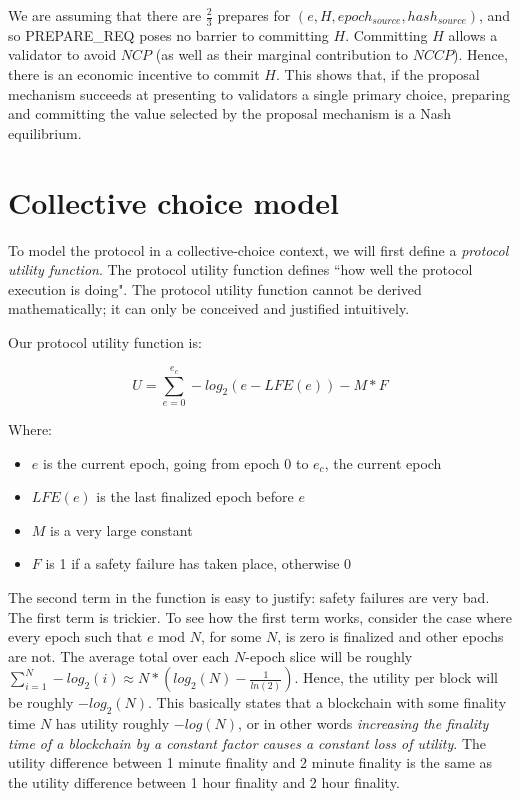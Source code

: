 \documentclass[12pt]{article}
\begin{document}
We are assuming that there are $\frac{2}{3}$ prepares for $(e, H, epoch_{source}, hash_{source})$, and so PREPARE\_REQ poses no barrier to committing $H$. Committing $H$ allows a validator to avoid $NCP$ (as well as their marginal contribution to $NCCP$). Hence, there is an economic incentive to commit $H$. This shows that, if the proposal mechanism succeeds at presenting to validators a single primary choice, preparing and committing the value selected by the proposal mechanism is a Nash equilibrium.

\section{Collective choice model}

To model the protocol in a collective-choice context, we will first define a \textit{protocol utility function}. The protocol utility function defines ``how well the protocol execution is doing". The protocol utility function cannot be derived mathematically; it can only be conceived and justified intuitively.

Our protocol utility function is:

$$U = \sum_{e = 0}^{e_c} -log_2(e - LFE(e)) - M * F$$

Where:

\begin{itemize}
\item $e$ is the current epoch, going from epoch $0$ to $e_c$, the current epoch
\item $LFE(e)$ is the last finalized epoch before $e$
\item $M$ is a very large constant
\item $F$ is 1 if a safety failure has taken place, otherwise 0
\end{itemize}

The second term in the function is easy to justify: safety failures are very bad. The first term is trickier. To see how the first term works, consider the case where every epoch such that $e$ mod $N$, for some $N$, is zero is finalized and other epochs are not. The average total over each $N$-epoch slice will be roughly $\sum_{i=1}^N -log_2(i) \approx N * (log_2(N) - \frac{1}{ln(2)})$. Hence, the utility per block will be roughly $-log_2(N)$. This basically states that a blockchain with some finality time $N$ has utility roughly $-log(N)$, or in other words \textit{increasing the finality time of a blockchain by a constant factor causes a constant loss of utility}. The utility difference between 1 minute finality and 2 minute finality is the same as the utility difference between 1 hour finality and 2 hour finality.
\end{document}
